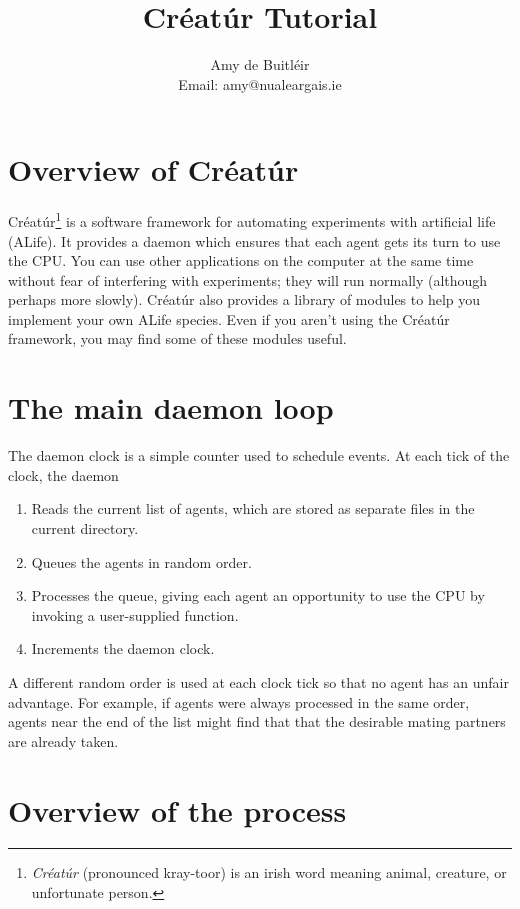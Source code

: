 \documentclass[a4paper,10pt]{report}
\title{Créatúr Tutorial}
\author{Amy de Buitl\'eir\\
        Email: amy@nualeargais.ie}
\begin{document}
\maketitle

\tableofcontents

\chapter{Overview of Créatúr}

Créatúr\footnote{\emph{Créatúr} (pronounced kray-toor) is an irish word 
meaning animal, creature, or unfortunate person.} 
is a software framework for automating experiments
with artificial life (ALife). 
It provides a daemon which ensures that each agent gets its turn 
to use the CPU. 
You can use other applications on the computer at the same time
without fear of interfering with experiments; they
will run normally (although perhaps more slowly).
Créatúr also provides a library of modules to help you implement your own 
ALife species.
Even if you aren't using the Créatúr framework, you may find some of these
modules useful.

\chapter{The main daemon loop}
\label{sec:daemon}

The daemon clock is a simple counter used to schedule events.
At each tick of the clock, the daemon

\begin{enumerate}
\item Reads the current list of agents, which are stored as separate files in
the current directory.
\item Queues the agents in random order.
\item Processes the queue, giving each agent an opportunity
to use the CPU by invoking a user-supplied function.
\item Increments the daemon clock.
\end {enumerate}

A different random order is used at each clock tick
so that no agent has an unfair advantage.
For example, if agents were always processed in the same order, 
agents near the end of the list might find that that the desirable mating
partners are already taken.

\chapter{Overview of the process}
\end{document}
